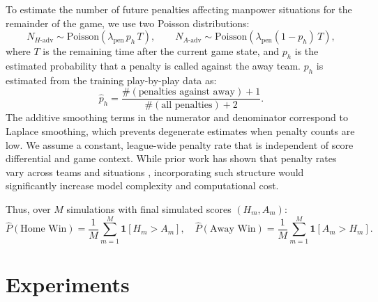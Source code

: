 \documentclass{article}
\begin{document}
To estimate the number of future penalties affecting manpower situations for the remainder of the game, we use two Poisson distributions:
\[
N_{H\text{-adv}} \sim \mathrm{Poisson}\!\left(\lambda_{\mathrm{pen}}\,p_h\,T\right),\qquad
N_{A\text{-adv}} \sim \mathrm{Poisson}\!\left(\lambda_{\mathrm{pen}}(1-p_h)\,T\right),
\]
where $T$ is the remaining time after the current game state, and $p_h$ is the estimated
probability that a penalty is called against the away team.
$p_h$ is estimated from the training play-by-play data as:
\[
\hat p_h
=
\frac{\#(\text{penalties against away}) + 1}
{\#(\text{all penalties}) + 2}.
\]
The additive smoothing terms in the numerator and denominator correspond to Laplace smoothing, which prevents degenerate estimates when penalty counts are low. We assume a constant, league-wide penalty rate that is independent of score differential and game context. While prior work has shown that penalty rates vary across teams and situations \citep{buttrey2016predicting}, incorporating such structure would significantly increase model complexity and computational cost.

Thus, over $M$ simulations with final simulated scores $(H_m, A_m)$:
\[
\hat P(\text{Home Win})=\frac{1}{M}\sum_{m=1}^M\mathbf{1}[H_m>A_m],\quad
\hat P(\text{Away Win})=\frac{1}{M}\sum_{m=1}^M\mathbf{1}[A_m>H_m].
\]
\section{Experiments}
\end{document}
